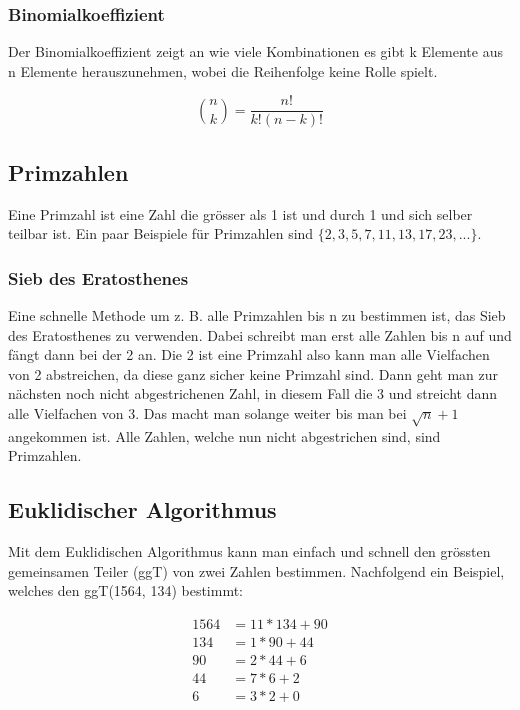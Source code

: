 \documentclass[12pt, a4paper, oneside]{article}
\begin{document}
\subsubsection{Binomialkoeffizient}
Der Binomialkoeffizient zeigt an wie viele Kombinationen es gibt k Elemente aus n Elemente herauszunehmen, wobei die Reihenfolge keine Rolle spielt.

\begin{equation*}
  \binom{n}{k} = \frac{n!}{k!(n-k)!}
\end{equation*}

\subsection{Primzahlen}
Eine Primzahl ist eine Zahl die grösser als 1 ist und durch 1 und sich selber teilbar ist. Ein paar Beispiele für Primzahlen sind $\{2, 3, 5, 7, 11, 13, 17, 23, ...\}$.

\subsubsection{Sieb des Eratosthenes}
Eine schnelle Methode um z. B. alle Primzahlen bis n zu bestimmen ist, das Sieb des Eratosthenes zu verwenden. Dabei schreibt man erst alle Zahlen bis n auf und fängt dann bei der 2 an. Die 2 ist eine Primzahl also kann man alle Vielfachen von 2 abstreichen, da diese ganz sicher keine Primzahl sind. Dann geht man zur nächsten noch nicht abgestrichenen Zahl, in diesem Fall die 3 und streicht dann alle Vielfachen von 3. Das macht man solange weiter bis man bei $\sqrt{n} + 1$ angekommen ist. Alle Zahlen, welche nun nicht abgestrichen sind, sind Primzahlen.

\subsection{Euklidischer Algorithmus}
Mit dem Euklidischen Algorithmus kann man einfach und schnell den grössten gemeinsamen Teiler (ggT) von zwei Zahlen bestimmen. Nachfolgend ein Beispiel, welches den ggT(1564, 134) bestimmt:

\begin{equation*} \label{eq2}
  \begin{split}
    1564 & = 11 * 134 + 90 \\
    134 & = 1 * 90 + 44 \\
    90 & = 2 * 44 + 6 \\
    44 & = 7 * 6 + 2 \\
    6 & = 3 * 2 + 0
  \end{split}
\end{equation*}
\end{document}
